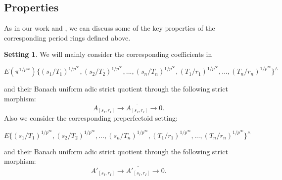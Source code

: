 \documentclass[12pt]{amsart}
\newtheorem{proposition}[theorem]{Proposition}
\theoremstyle{definition}
\numberwithin{equation}{section}
\newtheorem{setting}[theorem]{Setting}
\begin{document}

\subsection{Properties}



\indent As in our work \cite{T2} and \cite{KL2}, we can discuss some of the key properties of the corresponding period rings defined above. 


\begin{setting}
We will mainly consider the corresponding coefficients in 
\begin{center}
$E(\pi^{1/p^\infty})\{(s_1/T_1)^{1/p^\infty},(s_2/T_2)^{1/p^\infty},...,(s_n/T_n)^{1/p^\infty},(T_1/r_1)^{1/p^\infty},...,(T_n/r_n)^{1/p^\infty}\}^\wedge$ 
\end{center}
and their Banach uniform adic strict quotient through the following strict morphism:
\begin{displaymath}
A_{[s_I,r_I]}\rightarrow \overline{A_{[s_I,r_I]}}\rightarrow 0.	
\end{displaymath}
Also we consider the corresponding preperfectoid setting:
\begin{center}
$E\{(s_1/T_1)^{1/p^\infty},(s_2/T_2)^{1/p^\infty},...,(s_n/T_n)^{1/p^\infty},(T_1/r_1)^{1/p^\infty},...,(T_n/r_n)^{1/p^\infty}\}^\wedge$ 
\end{center}
and their Banach uniform adic strict quotient through the following strict morphism:
\begin{displaymath}
A'_{[s_I,r_I]}\rightarrow \overline{A'_{[s_I,r_I]}}\rightarrow 0.	
\end{displaymath} 
 	
\end{setting}



	


	
\end{document}
